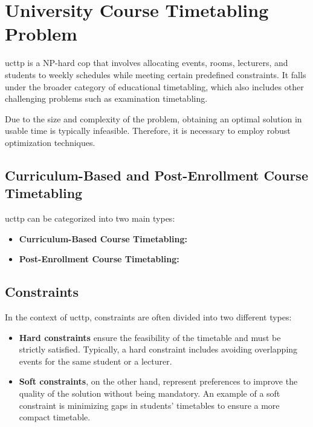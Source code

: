 \section{University Course Timetabling Problem}
\ac{ucttp} is a NP-hard \ac{cop} that involves allocating events, rooms, lecturers, and students to weekly schedules while meeting certain predefined constraints. It falls under the broader category of educational timetabling, which also includes other challenging problems such as examination timetabling. 

Due to the size and complexity of the problem, obtaining an optimal solution in usable time is typically infeasible. Therefore, it is necessary to employ robust optimization techniques.

\subsection{Curriculum-Based and Post-Enrollment Course Timetabling}

\ac{ucttp} can be categorized into two main types:

\begin{itemize}
\item \textbf{Curriculum-Based Course Timetabling:} 
\item \textbf{Post-Enrollment Course Timetabling:}
\end{itemize}

\subsection{Constraints}
In the context of \ac{ucttp}, constraints are often divided into two different types:
\begin{itemize}
\item \textbf{Hard constraints} ensure the feasibility of the timetable and must be strictly satisfied. Typically, a hard constraint includes avoiding overlapping events for the same student or a lecturer. 
\item \textbf{Soft constraints}, on the other hand, represent preferences to improve the quality of the solution without being mandatory. An example of a soft constraint is minimizing gaps in students' timetables to ensure a more compact timetable.
\end{itemize}


